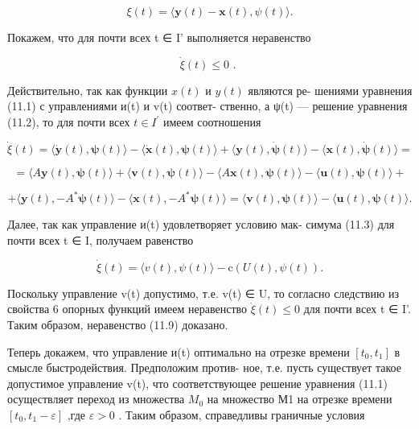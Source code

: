 \documentclass[8pt]{extarticle}
\begin{document}
\[
\xi \left( t\right)  = \langle \mathbf{y}\left( t\right)  - \mathbf{x}\left( t\right) ,\psi \left( t\right) \rangle . \tag{11.8}
\]

Покажем, что для почти всех t ∈ I’ выполняется неравенство

\[
\dot{\xi }\left( t\right)  \leq  0\text{ . } \tag{11.9}
\]

Действительно, так как функции \(x\left( t\right)\) и \(y\left( t\right)\) являются ре- шениями уравнения (11.1) с управлениями и(t) и v(t) соответ- ственно, а ψ(t) — решение уравнения (11.2), то для почти всех \(t \in  {I}^{\prime }\) имеем соотношения

\[
\dot{\xi }\left( t\right)  = \langle \dot{\mathbf{y}}\left( t\right) ,\mathbf{\psi }\left( t\right) \rangle  - \langle \dot{\mathbf{x}}\left( t\right) ,\mathbf{\psi }\left( t\right) \rangle  + \langle \mathbf{y}\left( t\right) ,\dot{\mathbf{\psi }}\left( t\right) \rangle  - \langle \mathbf{x}\left( t\right) ,\dot{\mathbf{\psi }}\left( t\right) \rangle  =
\]

\[
= \langle A\mathbf{y}\left( t\right) ,\mathbf{\psi }\left( t\right) \rangle  + \langle \mathbf{v}\left( t\right) ,\mathbf{\psi }\left( t\right) \rangle  - \langle A\mathbf{x}\left( t\right) ,\mathbf{\psi }\left( t\right) \rangle  - \langle \mathbf{u}\left( t\right) ,\mathbf{\psi }\left( t\right) \rangle  +
\]

\[
+ \langle \mathbf{y}\left( t\right) , - {A}^{ * }\mathbf{\psi }\left( t\right) \rangle  - \langle \mathbf{x}\left( t\right) , - {A}^{ * }\mathbf{\psi }\left( t\right) \rangle  = \langle \mathbf{v}\left( t\right) ,\mathbf{\psi }\left( t\right) \rangle  - \langle \mathbf{u}\left( t\right) ,\mathbf{\psi }\left( t\right) \rangle .
\]

Далее, так как управление и(t) удовлетворяет условию мак- симума (11.3) для почти всех t ∈ I, получаем равенство

\[
\dot{\xi }\left( t\right)  = \langle v\left( t\right) ,\psi \left( t\right) \rangle  - \mathrm{c}\left( {U\left( t\right) ,\psi \left( t\right) }\right) .
\]

Поскольку управление v(t) допустимо, т.е. v(t) ∈ U, то согласно следствию из свойства 6 опорных функций имеем неравенство \(\dot{\xi }\left( t\right)  \leq  0\) для почти всех t ∈ I’. Таким образом, неравенство (11.9) доказано.

Теперь докажем, что управление и(t) оптимально на отрезке времени \(\left\lbrack  {{t}_{0},{t}_{1}}\right\rbrack\) в смысле быстродействия. Предположим против- ное, т.е. пусть существует такое допустимое управление v(t), что соответствующее решение уравнения (11.1) осуществляет переход из множества \({M}_{0}\) на множество М1 на отрезке времени \(\left\lbrack  {{t}_{0},{t}_{1} - \varepsilon }\right\rbrack\) ,где \(\varepsilon  > 0\) . Таким образом, справедливы граничные условия
\end{document}
